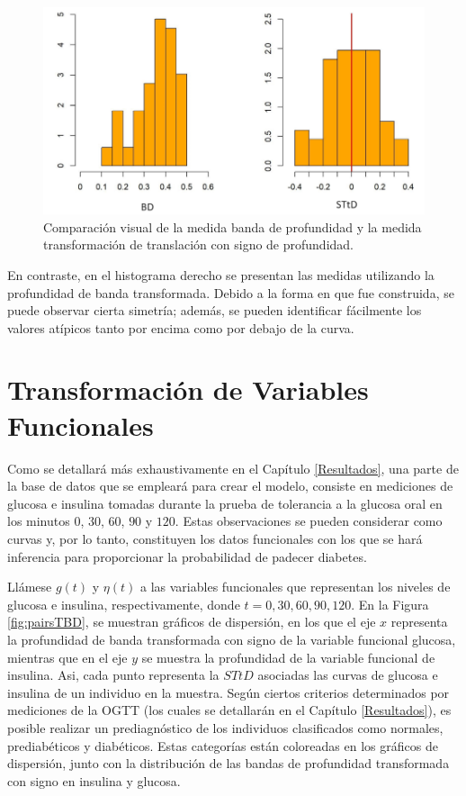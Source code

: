 \begin{figure}[H]
    \centering
    \includegraphics[width = 0.7 \textwidth]{Imagenes/comparacionBandas.png}
    \caption{Comparación visual de la medida banda de profundidad y la medida transformación de translación con signo de profundidad.}
    \label{fig:ComparaBandas}
\end{figure}

En contraste, en el histograma derecho se presentan las medidas utilizando la profundidad de banda transformada. Debido a la forma en que fue construida, se puede observar cierta simetría; además, se pueden identificar fácilmente los valores atípicos tanto por encima como por debajo de la curva.


\section{Transformación de Variables Funcionales}

Como se detallará más exhaustivamente en el Capítulo \ref{Resultados}, una parte de la base de datos que se empleará para crear el modelo, consiste en mediciones de glucosa e insulina tomadas durante la prueba de tolerancia a la glucosa oral en los minutos $0$, $30$, $60$, $90$ y $120$. Estas observaciones se pueden considerar como curvas y, por lo tanto, constituyen los datos funcionales con los que se hará inferencia para proporcionar la probabilidad de padecer diabetes. 

Llámese $g(t)$ y $\eta(t)$ a las variables funcionales que representan los niveles de glucosa e insulina, respectivamente, donde $t = 0, 30, 60, 90, 120$. En la Figura \ref{fig:pairsTBD}, se muestran gráficos de dispersión, en los que el eje $x$ representa la profundidad de banda transformada con signo de la variable funcional glucosa, mientras que en el eje $y$ se muestra la profundidad de la variable funcional de insulina. Asi, cada punto representa la $STtD$ asociadas las curvas de glucosa e insulina de un individuo en la muestra. Según ciertos criterios determinados por mediciones de la OGTT (los cuales se detallarán en el Capítulo \ref{Resultados}), es posible realizar un prediagnóstico de los individuos clasificados como normales, prediabéticos y diabéticos. Estas categorías están coloreadas en los gráficos de dispersión, junto con la distribución de las bandas de profundidad transformada con signo en insulina y glucosa.

